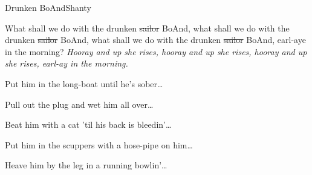 \begin{sang}{Drunken BoAnd}{Shanty}
\begin{vers}
What shall we do with the drunken \st{sailor} BoAnd,
what shall we do with the drunken \st{sailor} BoAnd,
what shall we do with the drunken \st{sailor} BoAnd,
earl-aye in the morning?
\emph{Hooray and up she rises,
      hooray and up she rises,
      hooray and up she rises,
      earl-ay in the morning.}
\end{vers}
\begin{vers}
Put him in the long-boat until he's sober\dots
\end{vers}
\begin{vers}
Pull out the plug and wet him all over\dots
\end{vers}
\begin{vers}
Beat him with a cat 'til his back is bleedin'\dots
\end{vers}
\begin{vers}
Put him in the scuppers with a hose-pipe on him\dots
\end{vers}
\begin{vers}
Heave him by the leg in a running bowlin'\dots
\end{vers}
\end{sang}
